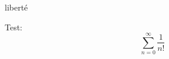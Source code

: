 \documentclass{article}
\begin{document}
liberté

Test:
\[ \sum_{n=0}^\infty \frac{1}{n!} \]
\end{document}
